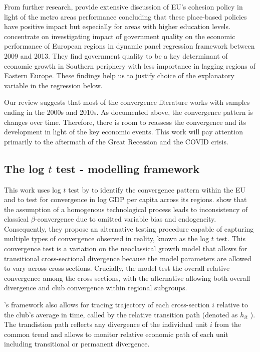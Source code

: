 \documentclass[11pt]{article}
\begin{document}
From further research, \citet{ehrlich2020place} provide extensive discussion of EU’s cohesion policy in light of the metro areas performance concluding that these place-based policies have positive impact but especially for areas with higher education levels. \citet{rodriguez2020institutional} concentrate on investigating impact of government quality on the economic performance of European regions in dynamic panel regression framework between 2009 and 2013. They find government quality to be a key determinant of economic growth in Southern periphery with less importance in lagging regions of Eastern Europe. These findings help us to justify choice of the explanatory variable in the regression below.

Our review suggests that most of the convergence literature works with samples ending in the 2000s and 2010s. As documented above, the convergence pattern is changes over time. Therefore, there is room to reassess the convergence and its development in light of the key economic events. This work will pay attention primarily to the aftermath of the Great Recession and the COVID crisis.


\subsection{The log $t$ test - modelling framework}

This work uses log $t$ test by \citet{phillips2007transition}  to identify the convergence pattern within the EU and to test for convergence in log GDP per capita across its regions. \citet{phillips2007transition} show that the assumption of a homogenous technological process  leads to inconsistency of classical $\beta$-convergence due to omitted variable bias and endogeneity. Consequently, they propose an alternative testing procedure capable of capturing multiple types of convergence observed in reality, known as the log $t$ test. This convergence test is a variation on the neoclassical growth model that allows for transitional cross-sectional divergence  because the model parameters are allowed to vary across cross-sections.  Crucially, the model test the overall relative convergence among the cross sections, with the alternative allowing both overall divergence and club convergence within regional subgroups. 

\citeauthor{phillips2009economic}'s framework also allows for tracing  trajectory of each cross-section $i$ relative to the club's average in time, called by \citet{phillips2009economic} the relative transition path (denoted as $h_{it}$ ). The trandistion path reflects any divergence of the individual unit $i$ from the common trend and allows to monitor relative economic path of each unit including transitional or permanent divergence.
\end{document}
